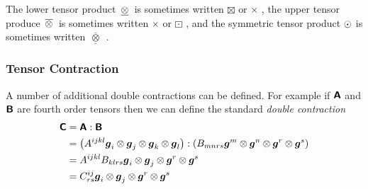 The lower tensor product $ \, \underline{\otimes} \, $ is sometimes written $\boxtimes$
\cite{del_piero_properties_1979,kintzel_fourth-order_2006,kintzel_fourth-order2_2006,steinmann:2015}
or $\times$ \cite{itskov_theory_2000}, the upper tensor produce
$ \, \overline{\otimes} \, $ is sometimes written $\times$
\cite{kintzel_fourth-order_2006,kintzel_fourth-order2_2006} or $\boxdot$
\cite{steinmann:2015}, and the symmetric tensor product $ \odot $ is
sometimes written $\, \overline{\underline{\otimes}} \,$ \cite{federico:2012}.

\subsubsection{Tensor Contraction}
\label{subsubsec:TensorContractionFourthOrder}

A number of additional double contractions can be defined. For example if
$\boldsymbol{\mathsf{A}}$ and $\boldsymbol{\mathsf{B}}$ are fourth order tensors then we can
define the standard \emph{double contraction} \ie
\begin{equation}
  \begin{aligned}
    \boldsymbol{\mathsf{C}}
    &= \boldsymbol{\mathsf{A}} : \boldsymbol{\mathsf{B}} \\
    &= \left( A^{ijkl}  \boldsymbol{g} _{i} \otimes  \boldsymbol{g} _{j} \otimes  \boldsymbol{g} _{k} \otimes  \boldsymbol{g} _{l}  \right) : \left( B_{mnrs}  \boldsymbol{g} ^{m} \otimes  \boldsymbol{g} ^{n} \otimes  \boldsymbol{g} ^{r} \otimes  \boldsymbol{g} ^{s}  \right) \\
    &=A^{ijkl}B_{klrs}  \boldsymbol{g} _{i} \otimes  \boldsymbol{g} _{j} \otimes  \boldsymbol{g} ^{r} \otimes  \boldsymbol{g} ^{s} \\
    &=C^{ij}_{rs}  \boldsymbol{g} _{i} \otimes  \boldsymbol{g} _{j} \otimes  \boldsymbol{g} ^{r} \otimes  \boldsymbol{g} ^{s} 
  \end{aligned}
\end{equation}
  
